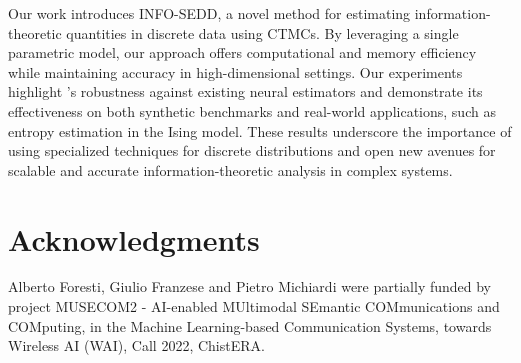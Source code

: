 Our work introduces \textsc{INFO-SEDD}, a novel method for estimating information-theoretic quantities in discrete data using \glspl{CTMC}. By leveraging a single parametric model, our approach offers computational and memory efficiency while maintaining accuracy in high-dimensional settings. Our experiments highlight \infosedd's robustness against existing neural estimators and demonstrate its effectiveness on both synthetic benchmarks and real-world applications, such as entropy estimation in the Ising model. These results underscore the importance of using specialized techniques for discrete distributions and open new avenues for scalable and accurate information-theoretic analysis in complex systems.

\section{Acknowledgments}
Alberto Foresti, Giulio Franzese and Pietro Michiardi were partially funded by project MUSECOM2 - AI-enabled MUltimodal SEmantic COMmunications and COMputing, in the Machine Learning-based Communication Systems, towards Wireless AI (WAI), Call 2022, ChistERA.




